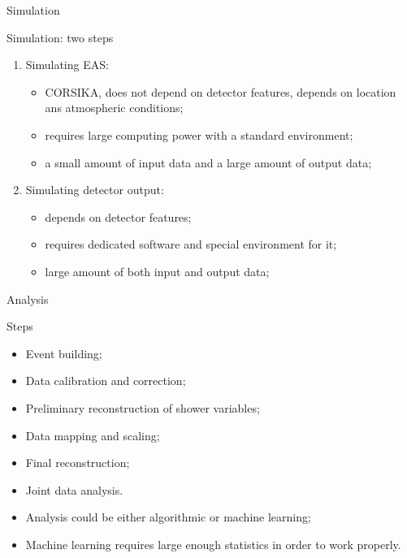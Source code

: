 \documentclass[18pt]{beamer}
\begin{document}
\begin{frame}{Simulation}
\begin{block}{Simulation: two steps}
\begin{enumerate}
\item Simulating EAS:
  \begin{itemize}
  \item CORSIKA, does not depend on detector features, depends on location ans atmospheric conditions;
  \item requires large computing power with a standard environment;
  \item a small amount of input data and a large amount of output data;
  \end{itemize}
\item Simulating detector output:
  \begin{itemize}
  \item depends on detector features;
  \item requires dedicated software and special environment for it;
  \item large amount of both input and output data;
  \end{itemize}
\end{enumerate}
\end{block}
\end{frame}

\begin{frame}{Analysis}
\begin{block}{Steps}
\begin{itemize}
\item Event building;
\item Data calibration and correction;
\item Preliminary reconstruction of shower variables;
\item Data mapping and scaling;
\item Final reconstruction;
\item Joint data analysis.
\end{itemize}
\end{block}

\begin{itemize}
\item Analysis could be either algorithmic or machine learning;
\item Machine learning requires large enough statistics in order to work properly.
\end{itemize}
\end{frame}
\end{document}

